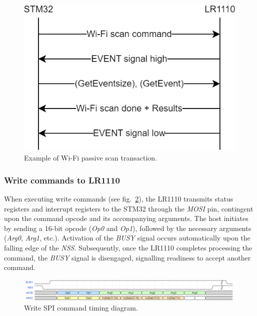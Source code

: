 
\begin{figure}[H]
    \centering
    \includegraphics[width=1\textwidth]{figures/event_example.png}
    \caption{Example of Wi-Fi passive scan transaction.}
    \label{fig:event_example}
\end{figure}


\subsubsection{Write commands to LR1110}
When executing write commands (see fig.~\ref{fig:write_command}), the LR1110 transmits status registers and interrupt registers to the STM32 through the \textit{MOSI} pin, contingent upon the command opcode and its accompanying arguments. The host initiates by sending a 16-bit opcode (\textit{Op0} and \textit{Op1}), followed by the necessary arguments (\textit{Arg0}, \textit{Arg1}, etc.). Activation of the \textit{BUSY} signal occurs automatically upon the falling edge of the \textit{NSS}. Subsequently, once the LR1110 completes processing the command, the \textit{BUSY} signal is disengaged, signalling readiness to accept another command.

\begin{figure}[H]
    \centering
    \includegraphics[width=1\textwidth]{figures/write_command.png}
    \caption{Write SPI command timing diagram.}
    \label{fig:write_command}
\end{figure}


